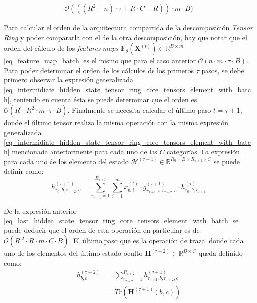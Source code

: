\documentclass[spanish]{article}
\theoremstyle{definition}
\theoremstyle{remark}
\numberwithin{equation}{section}
\numberwithin{equation}{section} %
\begin{document}
\begin{equation}
\label{order_tensor_train_arquitecture_shared}
\begin{gathered}
\mathcal{O}(((R^2+n)\cdot \tau+ R \cdot C + R )) \cdot m \cdot B )
\end{gathered}
\end{equation} \par
 Para calcular el orden de la arquitectura compartida de la descomposición \textit{Tensor Ring} y poder compararla con el de la otra descomposición, hay que notar que el orden del cálculo de los \textit{features maps} $\boldsymbol{F}_\theta(\boldsymbol{X}^{(t)}) \in \mathbb{R}^{B \times m}$ \eqref{eq_feature_map_batch} es el mismo que para el caso anterior $\mathcal{O}(n \cdot m \cdot \tau \cdot B)$. Para poder determinar el orden de los cálculos de los primeros $\tau$ pasos, se debe primero observar la expresión generalizada \eqref{eq_intermidiate_hidden_state_tensor_ring_core_tensors_element_with_batch}, teniendo en cuenta ésta se puede determinar que el orden es $\mathcal{O}(R^\prime \cdot R^2 \cdot m \cdot \tau \cdot B)$. Finalmente se necesita calcular el último paso $t=\tau +1$, donde el último tensor realiza la misma operación con la misma expresión generalizada \eqref{eq_intermidiate_hidden_state_tensor_ring_core_tensors_element_with_batch} mencionada anteriormente para cada uno de las $C$ categorías. La expresión para cada uno de los elemento del estado $\mathcal{H}^{(\tau+1)} \in \mathbb{R}^{R_0 \times B \times R_{\tau+2} \times C}$ se puede definir como: 
 \begin{equation}
\label{eq_last_hidden_state_tensor_ring_core_tensors_element_with_batch}
h^{(\tau+1)}_{r_0,b,r_{\tau+2},c}  = \sum^{R_{\tau+1}}_{r_{\tau+1}=1} \sum_{i=1}^m  x^{(t )}_{b,i}  \cdot g^{(\tau+1)}_{r_{\tau+1},i,r_{\tau+2},c} \cdot  h^{(\tau)}_{r_0,b,r_{\tau+1}} 
\end{equation}\par
De la expresión anterior \eqref{eq_last_hidden_state_tensor_ring_core_tensors_element_with_batch} se puede deducir que el orden de esta operación en particular es de $\mathcal{O}( R^{\prime 2} \cdot R \cdot m \cdot C \cdot B)$. El último paso que es la operación de traza, donde cada uno de los elementos del último estado oculto $\boldsymbol{H}^{(\tau + 2)} \in \mathbb{R}^{B \times C}$ queda definido como:
\begin{equation}
\label{eq_trace_hidden_state_tensor_ring_core_tensors_with_batch_element}
\begin{split}
h^{(\tau+2)}_{b,c}   &=  \sum^{R_{\tau+2}}_{r_{\tau+2}=1}  h^{(\tau+1)}_{r_{\tau+2},b,r_{\tau+2},c}  \\
&= Tr(\boldsymbol{H}^{(\tau+1)}(b,c))
\end{split}
\end{equation} \par
\end{document}

